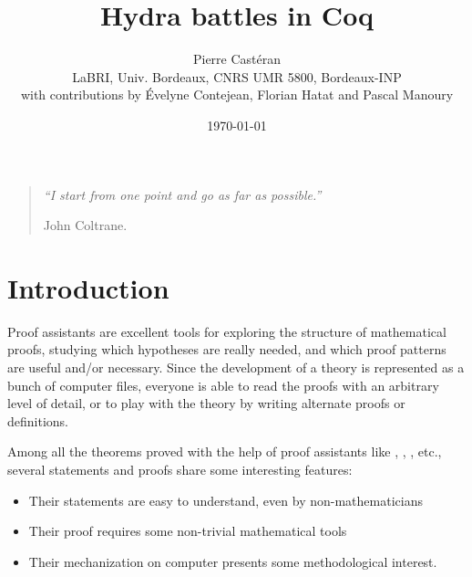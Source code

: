 \documentclass[a4paper]{book}
\author{Pierre Castéran\\ LaBRI, Univ. Bordeaux, CNRS UMR 5800, Bordeaux-INP\\with contributions by \'Evelyne Contejean,  Florian Hatat and Pascal Manoury}
\date{\today}
\title{Hydra battles in Coq}
\begin{document}
\maketitle




\cleardoublepage




\vspace{10cm}
\begin{quote} 
{ \Large {\it
``I start from one point and go as far as possible.'' } 

John Coltrane.}
\end{quote}







\tableofcontents
 


\chapter{Introduction}

  

\vspace{16pt}



Proof assistants are excellent tools for exploring the structure of mathematical proofs,
studying  which hypotheses are really needed, and which proof patterns are useful and/or
necessary. Since the development of a theory is represented as a bunch of computer files,
everyone is able to read the proofs with an arbitrary level of detail, or to play with the theory by writing alternate proofs or definitions.


Among all the theorems proved with the help of proof assistants like \coq{}, \isabelle{}, \hol{}, etc.,
several statements and proofs  share some interesting features:
\begin{itemize}
\item Their statements are easy to understand, even by non-mathematicians
\item Their proof requires some non-trivial mathematical tools
\item Their mechanization on computer presents some methodological interest.
\end{itemize}
\end{document}
